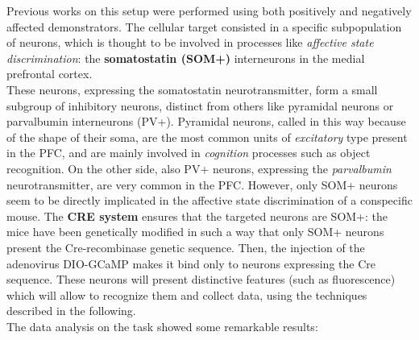\documentclass[12pt, a4paper]{report}
\begin{document}
Previous works on this setup \cite{8} %
 were performed using both positively and negatively affected demonstrators. The cellular target consisted in a specific subpopulation of neurons, which is thought to be involved in processes like \textit{affective state discrimination}: the \textbf{somatostatin (SOM+)} interneurons in the medial prefrontal cortex.\\
These neurons, expressing the somatostatin neurotransmitter, form a small
subgroup of inhibitory neurons, distinct from others like pyramidal neurons or parvalbumin interneurons (PV+). Pyramidal neurons, called in this way because of the shape of their soma, are the most common units of \textit{excitatory} type present in the PFC, and are mainly involved in \textit{cognition} processes such as object recognition. On the other side, also PV+ neurons, expressing the \textit{parvalbumin} neurotransmitter,  are  very common in the PFC. However, only SOM+ neurons seem to be directly implicated in the affective state discrimination of a conspecific mouse. The \textbf{CRE system} \cite{8} ensures that the targeted neurons are SOM+: the mice have been genetically modified in such a way that only SOM+ neurons present the Cre-recombinase genetic sequence. Then, the injection of the adenovirus DIO-GCaMP makes it bind only to neurons expressing the Cre sequence. These neurons will present  distinctive features (such as fluorescence) which will allow to recognize them and collect data, using the techniques described in the following. \\
The data analysis on the task showed some remarkable results:
\end{document}
